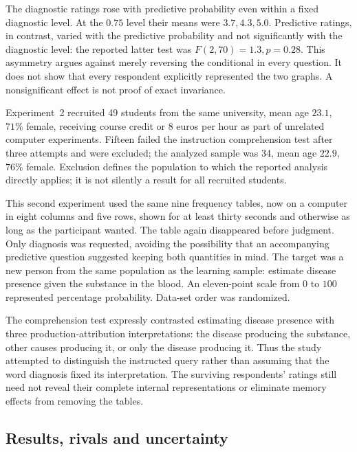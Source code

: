 The diagnostic ratings rose with predictive probability even within a
fixed diagnostic level. At the \(0.75\) level their means were
\(3.7,4.3,5.0\). Predictive ratings, in contrast, varied with the
predictive probability and not significantly with the diagnostic level:
the reported latter test was \(F(2,70)=1.3,p=0.28\).
This asymmetry argues against merely reversing the conditional in every
question. It does not show that every respondent explicitly represented
the two graphs. A nonsignificant effect is not proof of exact invariance.
\cite[pp.~285--287]{MederMayrhoferWaldmann2014StructureInduction}

Experiment~2 recruited 49 students from the same university, mean age
\(23.1\), \(71\%\) female, receiving course credit or \(8\) euros
per hour as part of unrelated computer experiments. Fifteen failed the
instruction comprehension test after three attempts and were excluded;
the analyzed sample was 34, mean age \(22.9\), \(76\%\) female.
Exclusion defines the population to which the reported analysis directly
applies; it is not silently a result for all recruited students.
\cite[pp.~289--290]{MederMayrhoferWaldmann2014StructureInduction}

This second experiment used the same nine frequency tables, now on a
computer in eight columns and five rows, shown for at least thirty seconds
and otherwise as long as the participant wanted. The table again disappeared
before judgment. Only diagnosis was requested, avoiding the possibility
that an accompanying predictive question suggested keeping both quantities
in mind. The target was a new person from the same population as the
learning sample: estimate disease presence given the substance in the blood.
An eleven-point scale from \(0\) to \(100\) represented percentage
probability. Data-set order was randomized.

The comprehension test expressly contrasted estimating disease presence
with three production-attribution interpretations: the disease producing
the substance, other causes producing it, or only the disease producing it.
Thus the study attempted to distinguish the instructed query rather than
assuming that the word diagnosis fixed its interpretation. The surviving
respondents' ratings still need not reveal their complete internal
representations or eliminate memory effects from removing the tables.
\cite[p.~290]{MederMayrhoferWaldmann2014StructureInduction}

\subsection{Results, rivals and uncertainty}

